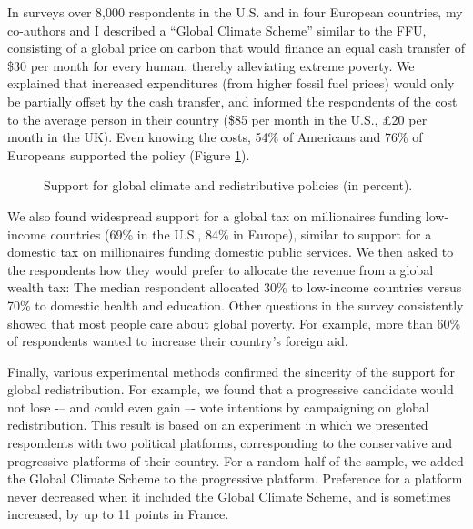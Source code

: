 \documentclass[12pt,english]{article}
\begin{document}

In surveys over 8,000 respondents in the U.S. and in four European countries,\citep{fabre_majority_2025} my co-authors and I described a ``Global Climate Scheme'' similar to the FFU, consisting of a global price on carbon that would finance an equal cash transfer of \$30 per month for every human, thereby alleviating extreme poverty. We explained that increased expenditures (from higher fossil fuel prices) would only be partially offset by the cash transfer, and informed the respondents of the cost to the average person in their country (\$85 per month in the U.S., £20 per month in the UK). Even knowing the costs, 54\% of Americans and 76\% of Europeans supported the policy (Figure \ref{fig:support}). 

\begin{figure}[h] %
  \caption[Support for global policies]{Support for global climate and redistributive policies (in percent).} 
  \label{fig:support} 
\end{figure}

We also found widespread support for a global tax on millionaires funding low-income countries (69\% in the U.S., 84\% in Europe), similar to support for a domestic tax on millionaires funding domestic public services. We then asked to the respondents how they would prefer to allocate the revenue from a global wealth tax: The median respondent allocated 30\% to low-income countries versus 70\% to domestic health and education. Other questions in the survey consistently showed that most people care about global poverty. For example, more than 60\% of respondents wanted to increase their country's foreign aid.

Finally, various experimental methods confirmed the sincerity of the support for global redistribution. For example, we found that a progressive candidate would not lose -– and could even gain –- vote intentions by campaigning on global redistribution. This result is based on an experiment in which we presented respondents with two political platforms, corresponding to the conservative and progressive platforms of their country. For a random half of the sample, we added the Global Climate Scheme to the progressive platform. Preference for a platform never decreased when it included the Global Climate Scheme, and is sometimes increased, by up to 11 points in France. %
\end{document}
